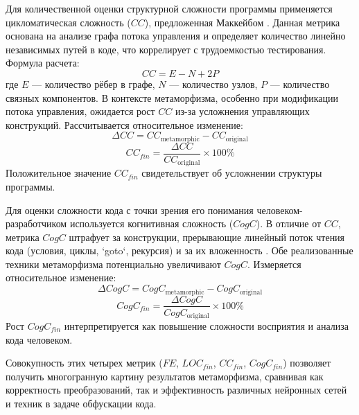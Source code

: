 Для количественной оценки структурной сложности программы применяется цикломатическая сложность ($CC$), предложенная Маккейбом \cite{McCabe76Complexity}. Данная метрика основана на анализе графа потока управления и определяет количество линейно независимых путей в коде, что коррелирует с трудоемкостью тестирования. Формула расчета: 
\begin{equation}
CC = E - N + 2P
\end{equation}
где $E$ — количество рёбер в графе, $N$ — количество узлов, $P$ — количество связных компонентов. В контексте метаморфизма, особенно при модификации потока управления, ожидается рост $CC$ из-за усложнения управляющих конструкций. Рассчитывается относительное изменение:
\begin{equation}
\Delta CC = CC_{\text{metamorphic}} - CC_{\text{original}}
\end{equation}
\begin{equation}
CC_{fin} = \frac{\Delta CC}{CC_{\text{original}}} \times 100\%
\end{equation}
Положительное значение $CC_{fin}$ свидетельствует об усложнении структуры программы.

Для оценки сложности кода с точки зрения его понимания человеком-разработчиком используется когнитивная сложность ($CogC$). В отличие от $CC$, метрика $CogC$ штрафует за конструкции, прерывающие линейный поток чтения кода (условия, циклы, `goto`, рекурсия) и за их вложенность \cite{SonarSourceCogC}. Обе реализованные техники метаморфизма потенциально увеличивают $CogC$. Измеряется относительное изменение:
\begin{equation}
\Delta CogC = CogC_{\text{metamorphic}} - CogC_{\text{original}}
\end{equation}
\begin{equation}
CogC_{fin} = \frac{\Delta CogC}{CogC_{\text{original}}} \times 100\%
\end{equation}
Рост $CogC_{fin}$ интерпретируется как повышение сложности восприятия и анализа кода человеком.

Совокупность этих четырех метрик ($FE$, $LOC_{fin}$, $CC_{fin}$, $CogC_{fin}$) позволяет получить многогранную картину результатов метаморфизма, сравнивая как корректность преобразований, так и эффективность различных нейронных сетей и техник в задаче обфускации кода.

